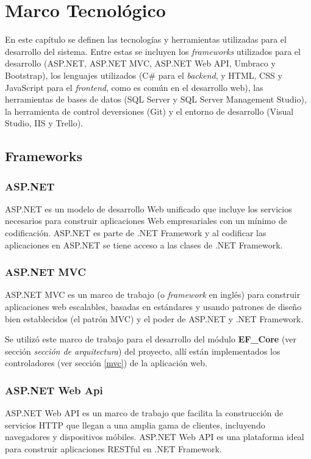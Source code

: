 \chapter{Marco Tecnológico}
En este capítulo se definen las tecnologías y herramientas utilizadas para el desarrollo del sistema. Entre estas se incluyen los \textit{frameworks} utilizados para el desarrollo (ASP.NET, ASP.NET MVC, ASP.NET Web API, Umbraco y Bootstrap), los lenguajes utilizados (C\# para el \textit{backend}, y HTML, CSS y JavaScript para el \textit{frontend}, como es común en el desarrollo web), las herramientas de bases de datos (SQL Server y SQL Server Management Studio), la herramienta de control deversiones (Git) y el entorno de desarrollo (Visual Studio, IIS y Trello).

\section{Frameworks}
    \subsection{ASP.NET}
    ASP.NET es un modelo de desarrollo Web unificado que incluye los servicios necesarios para construir aplicaciones Web empresariales con un mínimo de codificación. ASP.NET es parte de .NET Framework y al codificar las aplicaciones en ASP.NET se tiene acceso a las clases de .NET Framework. \cite{asp.netMicrosoft}

    \subsection{ASP.NET MVC}
    ASP.NET MVC es un marco de trabajo (o \textit{framework} en inglés) para construir aplicaciones web escalables, basadas en estándares y usando patrones de diseño bien establecidos (el patrón MVC) y el poder de ASP.NET y .NET Framework. \cite{asp.netMVCMicrosoft}

    Se utilizó este marco de trabajo para el desarrollo del módulo \textbf{EF\_Core} (ver sección \emph{sección de arquitectura}) del proyecto, allí están implementados los controladores (ver sección \ref{mvc}) de la aplicación web.

    \subsection{ASP.NET Web Api}
    ASP.NET Web API es un marco de trabajo que facilita la construcción de servicios HTTP que llegan a una amplia gama de clientes, incluyendo navegadores y dispositivos móbiles. ASP.NET Web API es una plataforma ideal para construir aplicaciones RESTful en .NET Framework. \cite{asp.netWebAPIMicrosoft}

